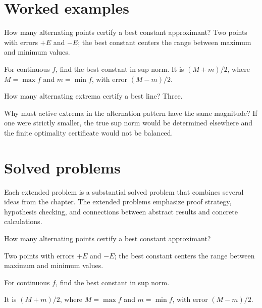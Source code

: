 \section{Worked examples}

\begin{example}\label{ex:ii23-worked-01}
How many alternating points certify a best constant approximant? Two points with errors $+E$ and $-E$; the best constant centers the range between maximum and minimum values.
\end{example}

\begin{example}\label{ex:ii23-worked-02}
For continuous $f$, find the best constant in sup norm. It is $(M+m)/2$, where $M=\max f$ and $m=\min f$, with error $(M-m)/2$.
\end{example}

\begin{example}\label{ex:ii23-worked-03}
How many alternating extrema certify a best line? Three.
\end{example}

\begin{example}\label{ex:ii23-worked-04}
Why must active extrema in the alternation pattern have the same magnitude? If one were strictly smaller, the true sup norm would be determined elsewhere and the finite optimality certificate would not be balanced.
\end{example}

\section{Solved problems}
Each extended problem is a substantial solved problem that combines several ideas from the chapter. The extended problems emphasize proof strategy, hypothesis checking, and connections between abstract results and concrete calculations.

\begin{problem}\label{prob:ii23-problem-01}
How many alternating points certify a best constant approximant?
\end{problem}
\begin{solution}
Two points with errors $+E$ and $-E$; the best constant centers the range between maximum and minimum values.
\end{solution}

\begin{problem}\label{prob:ii23-problem-02}
For continuous $f$, find the best constant in sup norm.
\end{problem}
\begin{solution}
It is $(M+m)/2$, where $M=\max f$ and $m=\min f$, with error $(M-m)/2$.
\end{solution}

